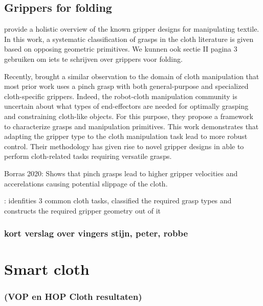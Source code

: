 \documentclass[\home/main.tex]{subfiles}
\begin{document}
\subsection{Grippers for folding}
\autocite{Borras2020} provide a holistic overview of the known gripper designs for manipulating textile. In this work, a systematic classification of grasps in the cloth literature is given based on opposing geometric primitives. 
 We kunnen ook sectie II pagina 3 gebruiken om iets te schrijven over grippers voor folding. 

 Recently, \textcite{Borras2020} brought a similar observation to the domain of cloth manipulation that most prior work uses a pinch grasp with both general-purpose and specialized cloth-specific grippers. Indeed, the robot-cloth manipulation community is uncertain about what types of end-effectors are needed for optimally grasping and constraining cloth-like objects. For this purpose, they propose a framework to characterize grasps and manipulation primitives.
 This work demonstrates that adapting the gripper type to the cloth manipulation task lead to more robust control. Their methodology has given rise to novel gripper designs in \autocite{Donaire2020} able to perform cloth-related tasks requiring versatile grasps. 


 Borras 2020:
 Shows that pinch grasps lead to higher gripper velocities and accerelations causing potential slippage of the cloth.     

 

\autocite{Donaire2020}: 
 idenfities 3 common cloth tasks, classified the required grasp types and constructs the required gripper geometry out of it


\subsubsection{kort verslag over vingers stijn, peter, robbe}


\section{Smart cloth}
\subsubsection{(VOP en HOP Cloth resultaten)}
\end{document}
